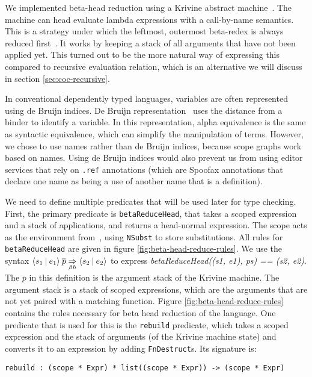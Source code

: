 We implemented beta-head reduction using a Krivine abstract machine~\cite{krivine}. The machine can head evaluate lambda expressions with a call-by-name semantics. This is a strategy under which the leftmost, outermost beta-redex is always reduced first~\cite{tapl}. It works by keeping a stack of all arguments that have not been applied yet. This turned out to be the more natural way of expressing this compared to recursive evaluation relation, which is an alternative we will discuss in section \ref{sec:coc-recursive}.

In conventional dependently typed languages, variables are often represented using de Bruijn indices. De Bruijn representation~\cite[Section 6.1]{tapl} uses the distance from a binder to identify a variable. In this representation, alpha equivalence is the same as syntactic equivalence, which can simplify the manipulation of terms. However, we chose to use names rather than de Bruijn indices, because scope graphs work based on names. Using de Bruijn indices would also prevent us from using editor services that rely on \verb|.ref| annotations (which are Spoofax annotations that declare one name as being a use of another name that is a definition).

We need to define multiple predicates that will be used later for type checking. First, the primary predicate is \verb|betaReduceHead|, that takes a scoped expression and a stack of applications, and returns a head-normal expression. The scope acts as the environment from~\cite{krivine}, using \verb|NSubst| to store substitutions. All rules for \verb|betaReduceHead| are given in figure \ref{fig:beta-head-reduce-rules}. We use the syntax $\langle s_1 \: | \: e_1\rangle \: \overline{p} \underset{\beta h}{\Rightarrow} \langle s_2 \: | \: e_2\rangle$ to express \textit{betaReduceHead((s1, e1), ps) == (s2, e2)}. The $\overline{p}$ in this definition is the argument stack of the Krivine machine. The argument stack is a stack of scoped expressions, which are the arguments that are not yet paired with a matching function. Figure \ref{fig:beta-head-reduce-rules} contains the rules necessary for beta head reduction of the language. One predicate that is used for this is the \verb|rebuild| predicate, which takes a scoped expression and the stack of arguments (of the Krivine machine state) and converts it to an expression by adding \verb|FnDestruct|s. Its signature is:
\begin{lstlisting}
rebuild : (scope * Expr) * list((scope * Expr)) -> (scope * Expr)
\end{lstlisting}

